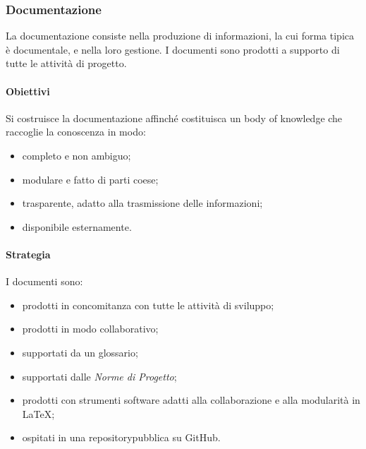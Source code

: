 	\subsubsection{Documentazione}
	La documentazione consiste nella produzione di informazioni, la cui forma tipica è documentale, e nella loro gestione. I documenti sono prodotti a supporto di tutte le attività di progetto.
		\paragraph{Obiettivi}
			Si costruisce la documentazione affinché costituisca un body of knowledge\glosp %
			che raccoglie la conoscenza in modo:
			\begin{itemize}
				\item completo e non ambiguo;
				\item modulare e fatto di parti coese;
				\item trasparente, adatto alla trasmissione delle informazioni;
				\item disponibile esternamente.
			\end{itemize}
		\paragraph{Strategia}
		I documenti sono:
		\begin{itemize}
			\item prodotti in concomitanza con tutte le attività di sviluppo;
			\item prodotti in modo collaborativo;
			\item supportati da un glossario;
			\item supportati dalle \textit{Norme di Progetto};
			\item prodotti con strumenti software adatti alla collaborazione e alla modularità in \LaTeX{};
			\item ospitati in una repository\glosp pubblica su GitHub\glo.
		\end{itemize}

